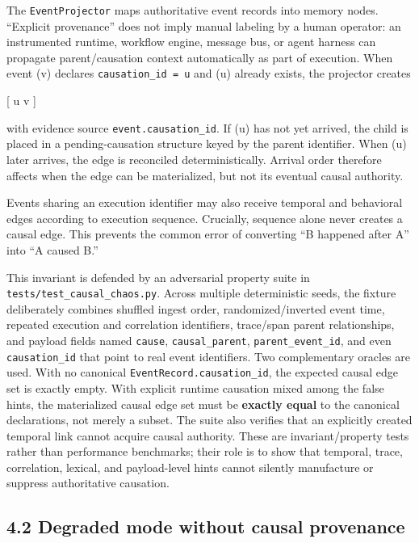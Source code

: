 \documentclass[
  11pt,
]{article}
\begin{document}
The \texttt{EventProjector} maps authoritative event records into memory
nodes. “Explicit provenance” does not imply manual labeling by a human
operator: an instrumented runtime, workflow engine, message bus, or agent
harness can propagate parent/causation context automatically as part of
execution. When event (v) declares \texttt{causation\_id\ =\ u} and (u)
already exists, the projector creates

{[} u  v {]}

with evidence source \texttt{event.causation\_id}. If (u) has not yet
arrived, the child is placed in a pending-causation structure keyed by
the parent identifier. When (u) later arrives, the edge is reconciled
deterministically. Arrival order therefore affects when the edge can be
materialized, but not its eventual causal authority.

Events sharing an execution identifier may also receive temporal and
behavioral edges according to execution sequence. Crucially, sequence
alone never creates a causal edge. This prevents the common error of
converting ``B happened after A'' into ``A caused B.''

This invariant is defended by an adversarial property suite in
\texttt{tests/test\_causal\_chaos.py}. Across multiple deterministic
seeds, the fixture deliberately combines shuffled ingest order,
randomized/inverted event time, repeated execution and correlation
identifiers, trace/span parent relationships, and payload fields named
\texttt{cause}, \texttt{causal\_parent}, \texttt{parent\_event\_id},
and even \texttt{causation\_id} that point to real event identifiers.
Two complementary oracles are used. With no canonical
\texttt{EventRecord.causation\_id}, the expected causal edge set is
exactly empty. With explicit runtime causation mixed among the false
hints, the materialized causal edge set must be \textbf{exactly equal}
to the canonical declarations, not merely a subset. The suite also
verifies that an explicitly created temporal link cannot acquire causal
authority. These are invariant/property tests rather than performance
benchmarks; their role is to show that temporal, trace, correlation,
lexical, and payload-level hints cannot silently manufacture or suppress
authoritative causation.

\subsection{4.2 Degraded mode without causal
provenance}\label{degraded-mode-without-causal-provenance}
\end{document}
